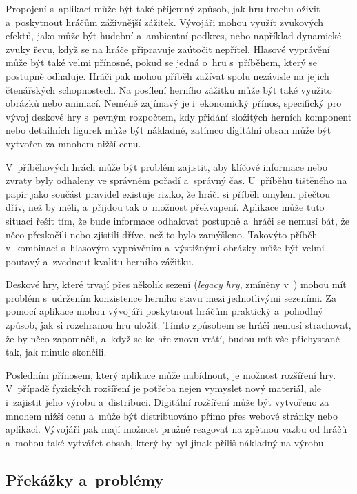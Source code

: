 Propojení s~aplikací může být také příjemný způsob, jak hru trochu oživit a~poskytnout hráčům záživnější zážitek. Vývojáři mohou využít zvukových efektů, jako může být hudební a~ambientní podkres, nebo například dynamické zvuky řevu, když se na hráče připravuje zaútočit nepřítel. Hlasové vyprávění může být také velmi přínosné, pokud se jedná o~hru s~příběhem, který se postupně odhaluje. Hráči pak mohou příběh zažívat spolu nezávisle na jejich čtenářských schopnostech. Na posílení herního zážitku může být také využito obrázků nebo animací. Neméně zajímavý je i~ekonomický přínos, specifický pro vývoj deskové hry s~pevným rozpočtem, kdy přidání složitých herních komponent nebo detailních figurek může být nákladné, zatímco digitální obsah může být vytvořen za mnohem nižší cenu.

V~příběhových hrách může být problém zajistit, aby klíčové informace nebo zvraty byly odhaleny ve správném pořadí a~správný čas. U~příběhu tištěného na papír jako součást pravidel existuje riziko, že hráči si příběh omylem přečtou dřív, než by měli, a~přijdou tak o~možnost překvapení. Aplikace může tuto situaci řešit tím, že bude informace odhalovat postupně a~hráči se nemusí bát, že něco přeskočili nebo zjistili dříve, než to bylo zamýšleno. Takovýto příběh v~kombinaci s~hlasovým vyprávěním a~výstižnými obrázky může být velmi poutavý a~zvednout kvalitu herního zážitku.

Deskové hry, které trvají přes několik sezení (\textit{legacy hry}, zmíněny v~) mohou mít problém s~udržením konzistence herního stavu mezi jednotlivými sezeními. Za pomocí aplikace mohou vývojáři poskytnout hráčům praktický a~pohodlný způsob, jak si rozehranou hru uložit. Tímto způsobem se hráči nemusí strachovat, že by něco zapomněli, a~když se ke hře znovu vrátí, budou mít vše přichystané tak, jak minule skončili.

Posledním přínosem, který aplikace může nabídnout, je možnost rozšíření hry. V~případě fyzických rozšíření je potřeba nejen vymyslet nový materiál, ale i~zajistit jeho výrobu a~distribuci. Digitální rozšíření může být vytvořeno za mnohem nižší cenu a~může být distribuováno přímo přes webové stránky nebo aplikaci. Vývojáři pak mají možnost pružně reagovat na zpětnou vazbu od hráčů a~mohou také vytvářet obsah, který by byl jinak příliš nákladný na výrobu.

\subsection{Překážky a~problémy}
\label{subsec:apps_app_problems}


